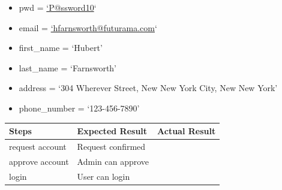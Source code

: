 \documentclass[letterpaper,10pt,english]{sphinxmanual}
\begin{document}
\begin{fulllineitems}
\begin{itemize}
\item {} 
pwd = \href{mailto:'P@ssword10}{`P@ssword10}`

\item {} 
email = \href{mailto:'hfarnsworth@futurama.com}{`hfarnsworth@futurama.com}`

\item {} 
first\_name = `Hubert'

\item {} 
last\_name = `Farnsworth'

\item {} 
address = `304 Wherever Street, New New York City, New New York'

\item {} 
phone\_number = `123-456-7890'

\end{itemize}

\begin{tabulary}{\linewidth}{|L|L|L|}
\hline
\textsf{\relax 
Steps
} & \textsf{\relax 
Expected Result
} & \textsf{\relax 
Actual Result
}\\
\hline
request account
 & 
Request confirmed
 & \\
\hline
approve account
 & 
Admin can approve
 & \\
\hline
login
 & 
User can login
 & \\
\hline\end{tabulary}


\end{fulllineitems}

\end{document}
